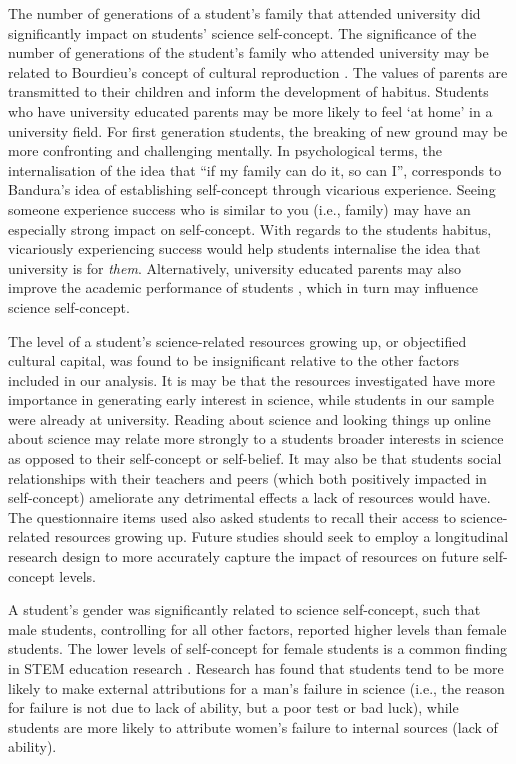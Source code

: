 The number of generations of a student's family that attended university did significantly impact on students' science self-concept. The significance of the number of generations of the student's family who attended university may be related to Bourdieu's concept of cultural reproduction \cite{Dimaggio1982}. The values of parents are transmitted to their children and inform the development of habitus. Students who have university educated parents may be more likely to feel `at home' in a university field. For first generation students, the breaking of new ground may be more confronting and challenging mentally. In psychological terms, the internalisation of the idea that ``if my family can do it, so can I'', corresponds to Bandura's \cite{bandura1986explanatory} idea of establishing self-concept through vicarious experience. Seeing someone experience success who is similar to you (i.e., family) may have an especially strong impact on self-concept. With regards to the students habitus, vicariously experiencing success would help students internalise the idea that university is for \textit{them}. Alternatively, university educated parents may also improve the academic performance of students \cite{paul2011cultural}, which in turn may influence science self-concept. 

The level of a student's science-related resources growing up, or objectified cultural capital, was found to be insignificant relative to the other factors included in our analysis. It is may be that the resources investigated have more importance in generating early interest in science, while students in our sample were already at university. Reading about science and looking things up online about science may relate more strongly to a students broader interests in science as opposed to their self-concept or self-belief. It may also be that students social relationships with their teachers and peers (which both positively impacted in self-concept) ameliorate any detrimental effects a lack of resources would have. The questionnaire items used also asked students to recall their access to science-related resources growing up. Future studies should seek to employ a longitudinal research design to more accurately capture the impact of resources on future self-concept levels. 

A student's gender was significantly related to science self-concept, such that male students, controlling for all other factors, reported higher levels than female students. The lower levels of self-concept for female students is a common finding in STEM education research \cite{sax2015but,Ellis_2016}. Research has found that students tend to be more likely to make external attributions for a man's failure in science (i.e., the reason for failure is not due to lack of ability, but a poor test or bad luck), while students are more likely to attribute women's failure to internal sources (lack of ability)\cite{LaCosse_2016}. 

